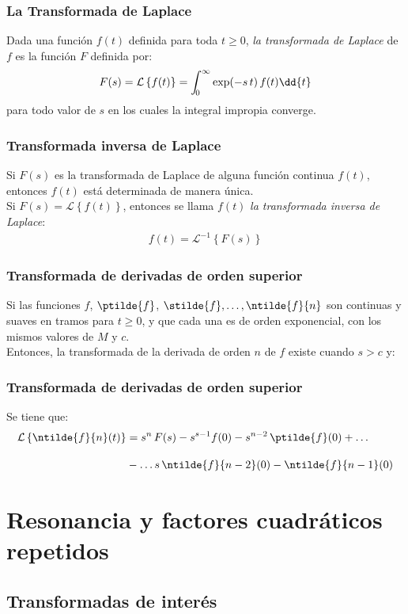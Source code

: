 \begin{frame}
\frametitle{La Transformada de Laplace}
Dada una función $f(t)$ definida para toda $t \geq 0$, \emph{la transformada de Laplace} de $f$ es la función $F$ definida por:
\pause
\begin{align*}
F(s) = \mathcal{L} \left\{ f(t) \right\} = \scaleint{5ex}_{\bs 0}^{\infty} \exp(-s \, t) \, f(t) \dd{t}
\end{align*}
para todo valor de $s$ en los cuales la integral impropia converge.
\end{frame}
\begin{frame}
\frametitle{Transformada inversa de Laplace}
Si $F(s)$ es la transformada de Laplace de alguna función continua $f(t)$, \pause entonces $f(t)$ está determinada de manera única.
\\
\bigskip
\pause
Si $F(s) = \mathcal{L} \left\{ f(t) \right\}$, entonces se llama $f(t)$ \emph{la transformada inversa de Laplace}:
\begin{align*}
f(t) = \mathcal{L}^{-1} \left\{ F(s) \right\}
\end{align*}
\end{frame}
\begin{frame}
\frametitle{Transformada de derivadas de orden superior}
Si las funciones $f$, $\ptilde{f}$, $\stilde{f}, \ldots, \ntilde{f}{n}$ son continuas y suaves en tramos para $t \geq 0$, y que cada una es de orden exponencial, con los mismos valores de $M$ y $c$.
\\
\bigskip
\pause
Entonces, la transformada de la derivada de orden $n$ de $f$ existe cuando $s > c$ y:
\end{frame}
\begin{frame}
\frametitle{Transformada de derivadas de orden superior}
Se tiene que:
\begin{align*}
\mathcal{L} \left\{ \ntilde{f}{n} (t) \right\} &= s^{n} \, F(s) - s^{s-1} f(0) - s^{n-2} \, \ptilde{f}(0) + \ldots \\[1em]
&- \ldots s \, \ntilde{f}{n-2}(0) - \ntilde{f}{n-1}(0)
\end{align*}

\end{frame}

\section{Resonancia y factores cuadráticos repetidos}
\subsection{Transformadas de interés}

